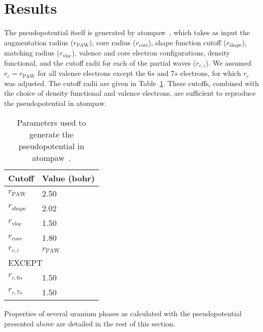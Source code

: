 \section{Results}
The pseudopotential itself is generated by
atompaw~\cite{holzwarth2001projector,tackett2001projector}, which takes as
input the augmentation radius ($r_\text{PAW}$), core radius ($r_\text{core}$),
shape function cutoff ($r_\text{shape}$), matching radius ($r_\text{vloc}$),
valence and core electron configurations, density functional, and the
cutoff radii for each of the partial waves ($r_{c,i}$). We assumed
$r_c = r_\text{PAW}$ for all valence electrons except the $6s$ and $7s$
electrons, for which $r_c$ was adjusted. The cutoff radii are given in
Table~\ref{table:pseudopotential}.
These cutoffs, combined with the choice of density functional and valence
electrons, are sufficient to reproduce the pseudopotential in atompaw.
\begin{table}
  \caption[Parameters used to generate the pseudopotential in
    atompaw]{Parameters used to generate the pseudopotential in
    atompaw~\cite{holzwarth2001projector,tackett2001projector}.}
  \label{table:pseudopotential}
  \centering
  \begin{tabular}{l l}
    \hline
    Cutoff & Value (bohr) \\
    \hline
    $r_\text{PAW}^{}$   & 2.50 \\
    $r_\text{shape}^{}$ & 2.02 \\
    $r_\text{vloc}^{}$  & 1.50 \\
    $r_\text{core}^{}$  & 1.80 \\
    \hline
    $r_{c,i}^{}$ & $r_\text{PAW}$ \\
    \multicolumn{2}{l}{\quad EXCEPT} \\
    $r_{c,6s}^{}$       & 1.50 \\
    $r_{c,7s}^{}$       & 1.50 \\
    \hline
  \end{tabular}
\end{table}

Properties of several uranium phases as calculated with the pseudopotential
presented above are detailed in the rest of this section.

